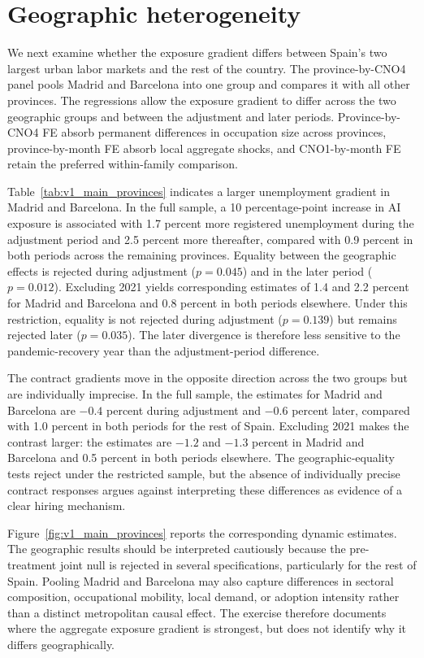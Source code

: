 \section{Geographic heterogeneity}
\label{sec:v1_geographic}

We next examine whether the exposure gradient differs between Spain's two largest urban labor markets and the rest of the country. The province-by-CNO4 panel pools Madrid and Barcelona into one group and compares it with all other provinces. The regressions allow the exposure gradient to differ across the two geographic groups and between the adjustment and later periods. Province-by-CNO4 FE absorb permanent differences in occupation size across provinces, province-by-month FE absorb local aggregate shocks, and CNO1-by-month FE retain the preferred within-family comparison.



Table~\ref{tab:v1_main_provinces} indicates a larger unemployment gradient in Madrid and Barcelona. In the full sample, a 10 percentage-point increase in AI exposure is associated with 1.7 percent more registered unemployment during the adjustment period and 2.5 percent more thereafter, compared with 0.9 percent in both periods across the remaining provinces. Equality between the geographic effects is rejected during adjustment (\(p=0.045\)) and in the later period (\(p=0.012\)). Excluding 2021 yields corresponding estimates of 1.4 and 2.2 percent for Madrid and Barcelona and 0.8 percent in both periods elsewhere. Under this restriction, equality is not rejected during adjustment (\(p=0.139\)) but remains rejected later (\(p=0.035\)). The later divergence is therefore less sensitive to the pandemic-recovery year than the adjustment-period difference.

The contract gradients move in the opposite direction across the two groups but are individually imprecise. In the full sample, the estimates for Madrid and Barcelona are \(-0.4\) percent during adjustment and \(-0.6\) percent later, compared with 1.0 percent in both periods for the rest of Spain. Excluding 2021 makes the contrast larger: the estimates are \(-1.2\) and \(-1.3\) percent in Madrid and Barcelona and 0.5 percent in both periods elsewhere. The geographic-equality tests reject under the restricted sample, but the absence of individually precise contract responses argues against interpreting these differences as evidence of a clear hiring mechanism.

Figure~\ref{fig:v1_main_provinces} reports the corresponding dynamic estimates. The geographic results should be interpreted cautiously because the pre-treatment joint null is rejected in several specifications, particularly for the rest of Spain. Pooling Madrid and Barcelona may also capture differences in sectoral composition, occupational mobility, local demand, or adoption intensity rather than a distinct metropolitan causal effect. The exercise therefore documents where the aggregate exposure gradient is strongest, but does not identify why it differs geographically.



